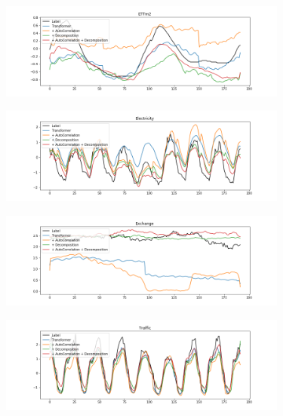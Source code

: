 \begin{figure}[ht]
    \centering
    \begin{subfigure}{0.6\textwidth}
        \includegraphics[width=\textwidth]{img/pred_ETTm2.png}
    \end{subfigure}
    \begin{subfigure}{0.6\textwidth}
        \includegraphics[width=\textwidth]{img/pred_Electricity.png}
    \end{subfigure}
    \begin{subfigure}{0.6\textwidth}
        \includegraphics[width=\textwidth]{img/pred_Exchange.png}
    \end{subfigure}
    \begin{subfigure}{0.6\textwidth}
        \includegraphics[width=\textwidth]{img/pred_Traffic.png}

\end{subfigure}
\end{figure}
